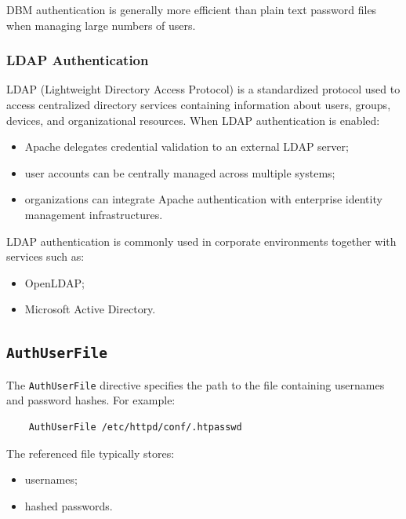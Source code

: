\documentclass{scrbook}
\begin{document}
	DBM authentication is generally more efficient than plain text password files when managing large numbers of users.
	
	\subsubsection{LDAP Authentication}
	
	LDAP (Lightweight Directory Access Protocol) is a standardized protocol used to access centralized directory services containing information about users, groups, devices, and organizational resources. When LDAP authentication is enabled:
	\begin{itemize}
		\item Apache delegates credential validation to an external LDAP server;
		
		\item user accounts can be centrally managed across multiple systems;
		
		\item organizations can integrate Apache authentication with enterprise identity management infrastructures.
	\end{itemize}
	
	LDAP authentication is commonly used in corporate environments together with services such as:
	\begin{itemize}
		\item OpenLDAP;
		
		\item Microsoft Active Directory.
	\end{itemize}
	
	\subsection{\texttt{AuthUserFile}}
	
	The \texttt{AuthUserFile} directive specifies the path to the file containing usernames and password hashes. For example:
	
	\begin{lstlisting}
	AuthUserFile /etc/httpd/conf/.htpasswd
	\end{lstlisting}
	
	The referenced file typically stores:
	\begin{itemize}
		\item usernames;
		
		\item hashed passwords.
	\end{itemize}
	
\end{document}
